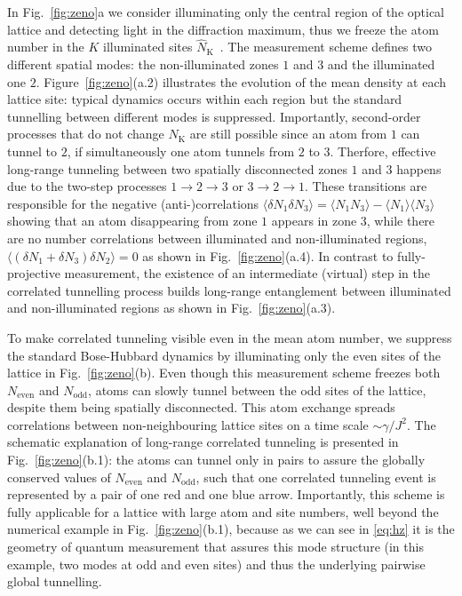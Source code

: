 In Fig.~\ref{fig:zeno}a we consider illuminating only the central
region of the optical lattice and detecting light in the diffraction
maximum, thus we freeze the atom number in the $K$ illuminated sites
$\hat{N}_\text{K}$~\cite{mekhov2009prl,mekhov2009pra}. The measurement
scheme defines two different spatial modes: the non-illuminated zones
$1$ and $3$ and the illuminated one $2$. Figure~\ref{fig:zeno}(a.2)
illustrates the evolution of the mean density at each lattice site:
typical dynamics occurs within each region but the standard tunnelling
between different modes is suppressed. Importantly, second-order
processes that do not change $N_\text{K}$ are still possible since an
atom from $1$ can tunnel to $2$, if simultaneously one atom tunnels
from $2$ to $3$. Therfore, effective long-range tunneling between two
spatially disconnected zones $1$ and $3$ happens due to the two-step
processes $1 \rightarrow 2 \rightarrow 3$ or
$3 \rightarrow 2 \rightarrow 1$. These transitions are responsible for
the negative (anti-)correlations
$\langle \delta N_1 \delta N_3 \rangle = \langle N_1 N_3 \rangle -
\langle N_1 \rangle \langle N_3 \rangle$ showing that an atom
disappearing from zone $1$ appears in zone $3$, while there are no
number correlations between illuminated and non-illuminated regions,
$\langle( \delta N_1 + \delta N_3 ) \delta N_2 \rangle = 0$ as shown
in Fig.~\ref{fig:zeno}(a.4). In contrast to fully-projective
measurement, the existence of an intermediate (virtual) step in the
correlated tunnelling process builds long-range entanglement between
illuminated and non-illuminated regions as shown in
Fig.~\ref{fig:zeno}(a.3).

To make correlated tunneling visible even in the mean atom number, we
suppress the standard Bose-Hubbard dynamics by illuminating only the
even sites of the lattice in Fig.~\ref{fig:zeno}(b). Even though this
measurement scheme freezes both $N_\text{even}$ and $N_\text{odd}$,
atoms can slowly tunnel between the odd sites of the lattice, despite
them being spatially disconnected. This atom exchange spreads
correlations between non-neighbouring lattice sites on a time scale
$\sim \gamma/J^2$. The schematic explanation of long-range correlated
tunneling is presented in Fig.~\ref{fig:zeno}(b.1): the atoms can
tunnel only in pairs to assure the globally conserved values of
$N_\text{even}$ and $N_\text{odd}$, such that one correlated tunneling
event is represented by a pair of one red and one blue
arrow. Importantly, this scheme is fully applicable for a lattice with
large atom and site numbers, well beyond the numerical example in
Fig.~\ref{fig:zeno}(b.1), because as we can see in \eqref{eq:hz}
it is the geometry of quantum measurement that assures this mode
structure (in this example, two modes at odd and even sites) and thus
the underlying pairwise global tunnelling.

